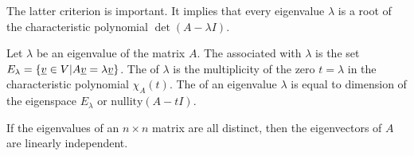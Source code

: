 The latter criterion is important.
It implies that every eigenvalue $\lambda$ is a root of the characteristic polynomial $\det( A - \lambda I )$.
\begin{definition}
Let $\lambda$ be an eigenvalue of the matrix $A$.
The  associated with $\lambda$ is the set $E_\lambda = \{ \underline{v} \in V | A \underline{v} = \lambda \underline{v} \}$.
The  of $\lambda$ is the multiplicity of the zero $t=\lambda$ in the characteristic polynomial $\chi_A (t)$.
The  of an eigenvalue $\lambda$ is equal to dimension of the eigenspace $E_\lambda$ or $\textrm{nullity}(A - t I)$.
\end{definition}

\begin{theorem}
If the eigenvalues of an $n \times n$ matrix are all distinct, then the eigenvectors of $A$ are linearly independent.
\end{theorem}

